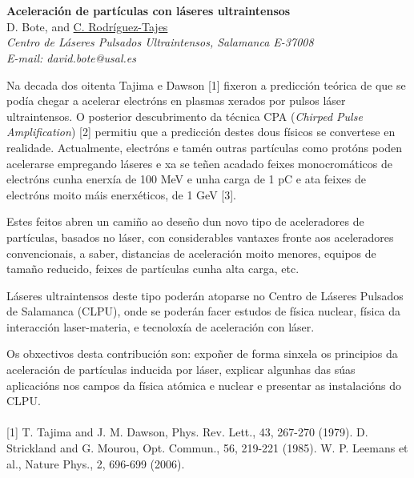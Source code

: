 \section*{}
\begin{center}
{\bf \Large
Aceleración de partículas con láseres ultraintensos
}
\\
\vspace{0.5cm}
D. Bote, and \underline{C. Rodríguez-Tajes}
\\
\vspace{0.5cm}
{\it
Centro de Láseres Pulsados Ultraintensos, Salamanca E-37008
}
\\
\vspace{0.5cm}
{\it E-mail: david.bote@usal.es}
\\
\vspace{0.5cm}
\end{center}
Na decada dos oitenta Tajima e Dawson [1] fixeron a predicción teórica de
que se podía chegar a acelerar electróns en plasmas xerados por pulsos láser
ultraintensos. O posterior descubrimento da técnica CPA (\textit{Chirped Pulse
Amplification}) [2] permitiu que a predicción destes dous físicos se convertese en
realidade. Actualmente, electróns e tamén outras partículas como protóns poden
acelerarse empregando láseres e xa se teñen acadado feixes monocromáticos de
electróns cunha enerxía de 100 MeV e unha carga de 1 pC e ata feixes de electróns
moito máis enerxéticos, de 1 GeV [3].

Estes feitos abren un camiño ao deseño dun novo tipo de aceleradores de
partículas, basados no láser, con considerables vantaxes fronte aos aceleradores
convencionais, a saber, distancias de aceleración moito menores, equipos de tamaño
reducido, feixes de partículas cunha alta carga, etc.

Láseres ultraintensos deste tipo poderán atoparse no Centro de Láseres
Pulsados de Salamanca (CLPU), onde se poderán facer estudos de física nuclear,
física da interacción laser-materia, e tecnoloxía de aceleración con láser.

Os obxectivos desta contribución son: expoñer de forma sinxela os principios
da aceleración de partículas inducida por láser, explicar algunhas das súas
aplicacións nos campos da física atómica e nuclear e presentar as instalacións do
CLPU.
\\
\vspace{0.5cm}
\\
{\footnotesize
[1] T. Tajima and J. M. Dawson, Phys. Rev. Lett., 43, 267-270 (1979).
\newline
[2] D. Strickland and G. Mourou, Opt. Commun., 56, 219-221 (1985).
\newline
[3] W. P. Leemans et al., Nature Phys., 2, 696-699 (2006).
}
\newpage
\setcounter{figure}{0}
